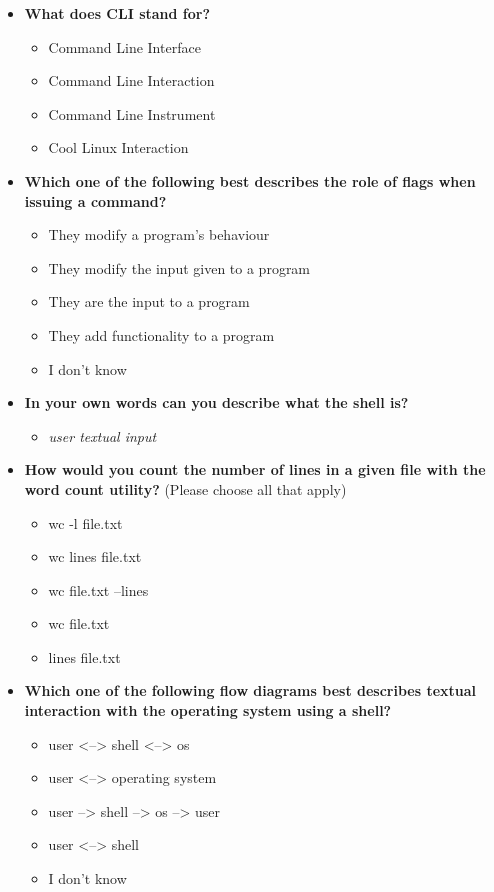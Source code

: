 \begin{itemize}
	\item  \textbf{What does CLI stand for?}
	      \begin{itemize}
		      \item Command Line Interface
		      \item Command Line Interaction
		      \item Command Line Instrument
		      \item Cool Linux Interaction
	      \end{itemize}

	\item  \textbf{Which one of the following best describes the role of flags when issuing a command?}
	      \begin{itemize}
		      \item They modify a program's behaviour
		      \item They modify the input given to a program
		      \item They are the input to a program
		      \item They add functionality to a program
		      \item I don't know
	      \end{itemize}

	\item  \textbf{In your own words can you describe what the shell is?}
	      \begin{itemize}
		      \item \textit{user textual input}
	      \end{itemize}

	\item  \textbf{How would you count the number of lines in a given file with the word count utility?} (Please choose all that apply)
	      \begin{itemize}
		      \item wc -l file.txt
		      \item wc lines file.txt
		      \item wc file.txt --lines
		      \item wc file.txt
		      \item lines file.txt
	      \end{itemize}

	\item  \textbf{Which one of the following flow diagrams best describes textual interaction with the operating system using a shell?}
	      \begin{itemize}
		      \item user <--> shell <--> os
		      \item user <--> operating system
		      \item user --> shell --> os --> user
		      \item user <--> shell
		      \item I don't know
	      \end{itemize}


\end{itemize}
